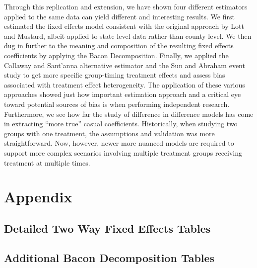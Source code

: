 \documentclass{article}
\begin{document}
Through this replication and extension, we have shown four different estimators applied to the same data can yield different and interesting results. We first estimated the fixed effects model consistent with the original approach by Lott and Mustard, albeit applied to state level data rather than county level. We then dug in further to the meaning and composition of the resulting fixed effects coefficients by applying the Bacon Decomposition. Finally, we applied the Callaway and Sant'anna alternative estimator and the Sun and Abraham event study to get more specific group-timing treatment effects and assess bias associated with treatment effect heterogeneity. The application of these various approaches showed just how important estimation approach and a critical eye toward potential sources of bias is when performing independent research. Furthermore, we see how far the study of difference in difference models has come in extracting ``more true'' casual coefficients. Historically, when studying two groups with one treatment, the assumptions and validation was more straightforward. Now, however, newer more nuanced models are required to support more complex scenarios involving multiple treatment groups receiving treatment at multiple times.  

\newpage

\section{Appendix}

\subsection{Detailed Two Way Fixed Effects Tables}







\newpage

\subsection{Additional Bacon Decomposition Tables}






\end{document}
